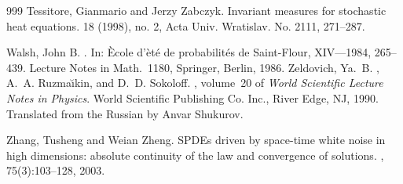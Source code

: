 \documentclass[a4paper,12pt]{article}
\theoremstyle{plain}
\theoremstyle{definition}
\begin{document}
\begin{thebibliography}{999}
Tessitore, Gianmario and Jerzy Zabczyk.
\newblock Invariant measures for stochastic heat equations. 
 18 (1998), no. 2, Acta Univ. Wratislav. No. 2111, 271--287. 

 Walsh, John B.
.
\newblock In: \`Ecole d'\`et\'e de probabilit\'es de Saint-Flour, XIV---1984, 265--439.
\newblock Lecture Notes in Math.\ 1180, Springer, Berlin, 1986.
%
Zeldovich, Ya.~B. , A.~A. Ruzma{\u\i}kin, and D.~D. Sokoloff.
, volume~20 of {\em World Scientific Lecture
  Notes in Physics}.
\newblock World Scientific Publishing Co. Inc., River Edge, NJ, 1990.
\newblock Translated from the Russian by Anvar Shukurov.

Zhang, Tusheng and Weian Zheng.
\newblock SPDEs driven by space-time white noise in high dimensions: absolute 
continuity of the law and convergence of solutions.
, 75(3):103--128, 2003.

\end{thebibliography}
\end{document}
